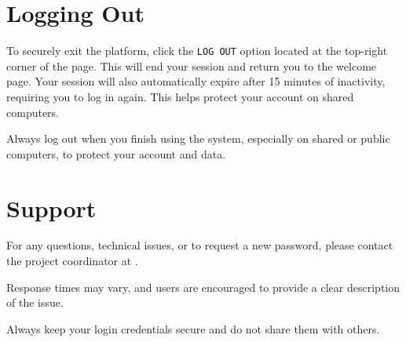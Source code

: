 \chapter{Logging Out} \label{chap:user-logout}

To securely exit the platform, click the \texttt{LOG OUT} option located at the top-right corner of the page. This will end your session and return you to the welcome page. Your session will also automatically expire after 15 minutes of inactivity, requiring you to log in again. This helps protect your account on shared computers.

Always log out when you finish using the system, especially on shared or public computers, to protect your account and data.


\chapter{Support} \label{chap:user-support}

For any questions, technical issues, or to request a new password, please contact the project coordinator at \href{mailto:\prjMail}{\prjMail}. 

Response times may vary, and users are encouraged to provide a clear description of the issue. 

Always keep your login credentials secure and do not share them with others.



